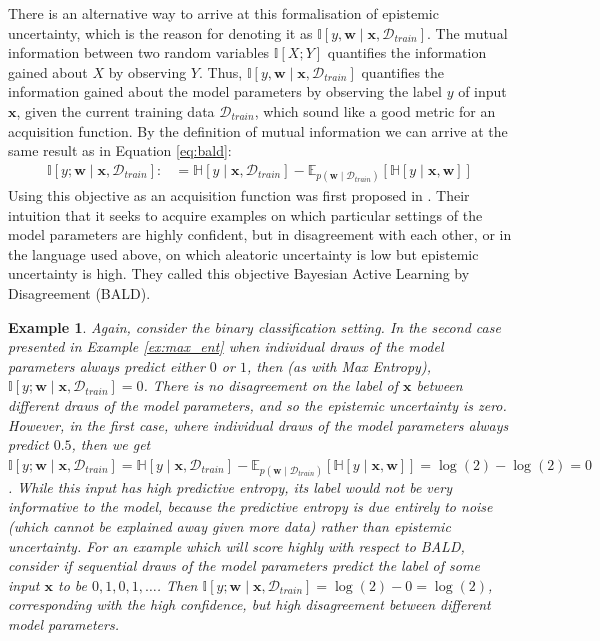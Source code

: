 \documentclass[11pt, a4paper, bibliography=totoc]{report}
\newcommand{\E}[2]{\mathbb{E}_{#1} \left[ #2 \right] }
\newcommand{\data}{\mathcal{D}}
\newcommand{\entropy}[1]{\mathbb{H} \left[ #1 \right] }
\newcommand{\MI}[1]{\mathbb{I} \left[ #1 \right] }
\newcommand{\w}{\mathbf{w}}
\newcommand{\x}{\mathbf{x}}
\newtheorem{example}{Example}
\begin{document}
There is an alternative way to arrive at this formalisation of epistemic uncertainty, which is the reason for denoting it as $ \MI{y, \w \mid \x, \data_{train}} $. The mutual information between two random variables $ \MI{X ; Y} $ quantifies the information gained about $ X $ by observing $ Y $. Thus, $ \MI{y, \w \mid \x, \data_{train}} $ quantifies the information gained about the model parameters by observing the label $ y $ of input $ \x $, given the current training data $ \data_{train} $, which sound like a good metric for an acquisition function. By the definition of mutual information we can arrive at the same result as in Equation \ref{eq:bald}:
\begin{align*}
\MI{y ; \w \mid \x, \data_{train}} :&= \entropy{y \mid \x, \data_{train}} - \E{p(\w \mid \data_{train})}{ \entropy{y \mid \x, \w }}
\end{align*} %
Using this objective as an acquisition function was first proposed in \cite{Houlsby2011}. Their intuition that it seeks to acquire examples on which particular settings of the model parameters are highly confident, but in disagreement with each other, or in the language used above, on which aleatoric uncertainty is low but epistemic uncertainty is high. They called this objective Bayesian Active Learning by Disagreement (BALD).

\begin{example}
	Again, consider the binary classification setting. In the second case presented in Example \ref{ex:max_ent} when individual draws of the model parameters always predict either $ 0 $ or $ 1 $, then (as with Max Entropy), $ \MI{y ; \w \mid \x, \data_{train}} = 0 $. There is no disagreement on the label of $ \x $ between different draws of the model parameters, and so the epistemic uncertainty is zero. However, in the first case, where individual draws of the model parameters always predict $ 0.5 $, then we get $ \MI{y ; \w \mid \x, \data_{train}} = \entropy{y \mid \x, \data_{train}} - \E{p(\w \mid \data_{train})}{ \entropy{y \mid \x, \w }} = \log(2) - \log(2) = 0 $. While this input has high predictive entropy, its label would not be very informative to the model, because the predictive entropy is due entirely to noise (which cannot be explained away given more data) rather than epistemic uncertainty. For an example which will score highly with respect to BALD, consider if sequential draws of the model parameters predict the label of some input $ \x $ to be $ 0, 1, 0, 1, \dots $. Then $ \MI{y ; \w \mid \x, \data_{train}} = \log(2) - 0 = \log(2) $, corresponding with the high confidence, but high disagreement between different model parameters.
\end{example}
\end{document}
